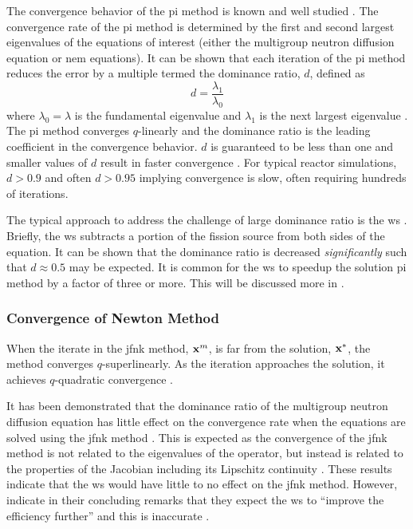       The convergence behavior of the \gls{pi} method is known and well studied 
      \cite{nakamura,gehinThesis,my_ms_thesis}. The convergence rate of the
      \gls{pi} method is determined by the first and second largest eigenvalues
      of the equations of interest (either the multigroup neutron diffusion
      equation or \gls{nem} equations). It can be shown that each iteration of
      the \gls{pi} method reduces the error by a multiple termed the dominance
      ratio, $d$, defined as
      \begin{equation}
        \label{eq:dominance_ratio}
        d = \frac{\lambda_1}{\lambda_0}
      \end{equation}
      where $\lambda_0 = \lambda$ is the fundamental eigenvalue and $\lambda_1$
      is the next largest eigenvalue \cite{my_ms_thesis}. The \gls{pi} method
      converges $q$-linearly and the dominance ratio is the leading coefficient
      in the convergence behavior. $d$ is guaranteed to be less than one and
      smaller values of $d$ result in faster convergence \cite{nakamura}. For
      typical reactor simulations, $d > 0.9$ and often $d > 0.95$ implying
      convergence is slow, often requiring hundreds of iterations.

      The typical approach to address the challenge of large dominance ratio is
      the \gls{ws} \cite{gehinThesis}. Briefly, the \gls{ws} subtracts a portion
      of the fission source from both sides of the equation.  It can be shown
      that the dominance ratio is decreased \textit{significantly} such that $d
      \approx 0.5$ may be expected. It is common for the \gls{ws} to speedup 
      the solution \gls{pi} method by a factor of three or more. This will be
      discussed more in .

    \subsubsection{Convergence of Newton Method}

      When the iterate in the \gls{jfnk} method, $\mathbf{x}^m$, is far from the
      solution, $\mathbf{x}^*$, the method converges $q$-superlinearly. As the
      iteration approaches the solution, it achieves $q$-quadratic convergence
      \cite{textbookkelley}.

      It has been demonstrated that the dominance ratio of the multigroup
      neutron diffusion equation has little effect on the convergence rate when
      the equations are solved using the \gls{jfnk} method \cite{gill_azmy}.
      This is expected as the convergence of the \gls{jfnk} method is not
      related to the eigenvalues of the operator, but instead is related to the
      properties of the Jacobian including its Lipschitz continuity
      \cite{textbookkelley}. These results indicate that the \gls{ws} would have
      little to no effect on the \gls{jfnk} method. However,
      \citeauthor{qe2paper} indicate in their concluding remarks that they
      expect the \gls{ws} to ``improve the efficiency further'' and this is
      inaccurate \cite{qe2paper}.
      

